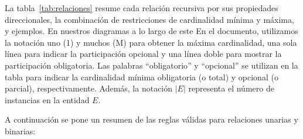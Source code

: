 La tabla~\ref{tab:relaciones} resume cada relación recursiva por sus propiedades direccionales, la combinación de restricciones de cardinalidad mínima y máxima, y ejemplos. En nuestros diagramas a lo largo de este En el documento, utilizamos la notación uno (1) y muchos (M) para obtener la máxima cardinalidad, una sola línea para indicar la participación opcional y una línea doble para mostrar la participación obligatoria. Las palabras ``obligatorio'' y ``opcional'' se utilizan en la tabla para indicar la cardinalidad mínima obligatoria (o total) y opcional (o parcial), respectivamente. Además, la notación $|E|$ representa el número de instancias en la entidad $E$.


A continuación se pone un resumen de las reglas válidas para relaciones unarias y binarias:

